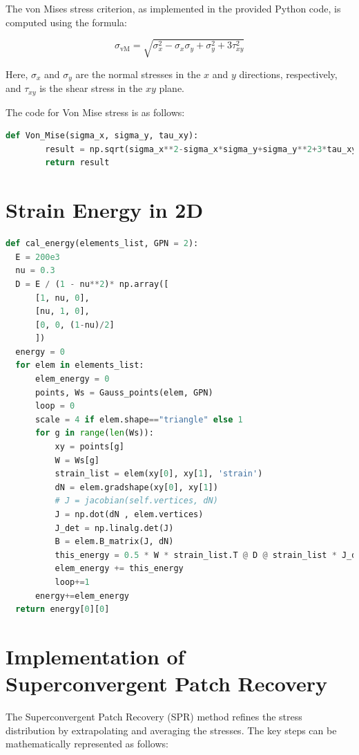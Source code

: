 \documentclass[twoside,twocolumn,10pt]{article}
\begin{document}
The von Mises stress criterion, as implemented in the provided Python code, is computed using the formula:

\[
\sigma_{\text{vM}} = \sqrt{\sigma_x^2 - \sigma_x \sigma_y + \sigma_y^2 + 3\tau_{xy}^2}
\]

Here, \( \sigma_x \) and \( \sigma_y \) are the normal stresses in the \( x \) and \( y \) directions, respectively, and \( \tau_{xy} \) is the shear stress in the \( xy \) plane.

The code for Von Mise stress is as follows:

\begin{lstlisting}[language=Python, caption=Von Mise stress]
  def Von_Mise(sigma_x, sigma_y, tau_xy):
        result = np.sqrt(sigma_x**2-sigma_x*sigma_y+sigma_y**2+3*tau_xy**2)
        return result
\end{lstlisting}



\section{Strain Energy in 2D}
\label{Apdx:energy}
\begin{lstlisting}[language=Python, caption=Strain energy in 2D]
def cal_energy(elements_list, GPN = 2):
  E = 200e3
  nu = 0.3
  D = E / (1 - nu**2)* np.array([
      [1, nu, 0],
      [nu, 1, 0],
      [0, 0, (1-nu)/2]
      ])
  energy = 0
  for elem in elements_list:
      elem_energy = 0
      points, Ws = Gauss_points(elem, GPN)
      loop = 0
      scale = 4 if elem.shape=="triangle" else 1
      for g in range(len(Ws)):
          xy = points[g]
          W = Ws[g]
          strain_list = elem(xy[0], xy[1], 'strain')
          dN = elem.gradshape(xy[0], xy[1])
          # J = jacobian(self.vertices, dN)
          J = np.dot(dN , elem.vertices)
          J_det = np.linalg.det(J)
          B = elem.B_matrix(J, dN)
          this_energy = 0.5 * W * strain_list.T @ D @ strain_list * J_det #* scale
          elem_energy += this_energy 
          loop+=1
      energy+=elem_energy
  return energy[0][0]
\end{lstlisting}


\section{Implementation of Superconvergent Patch Recovery}
\label{Apdx:SPR}
The Superconvergent Patch Recovery (SPR) method refines the stress distribution by extrapolating and averaging the stresses. The key steps can be mathematically represented as follows:
\end{document}
